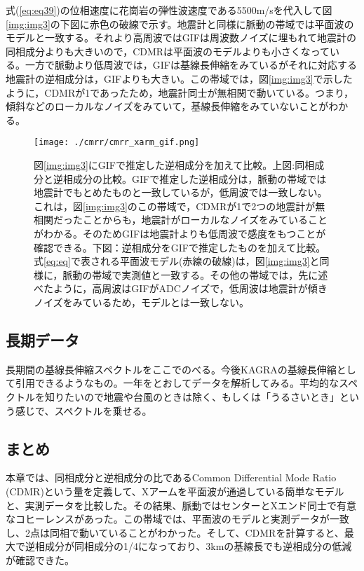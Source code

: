 式(\ref{eq:eq39})の位相速度に花崗岩の弾性波速度である5500m/sを代入して図\ref{img:img3}の下図に赤色の破線で示す。地震計と同様に脈動の帯域では平面波のモデルと一致する。それより高周波ではGIFは周波数ノイズに埋もれて地震計の同相成分よりも大きいので，CDMRは平面波のモデルよりも小さくなっている。一方で脈動より低周波では，GIFは基線長伸縮をみているがそれに対応する地震計の逆相成分は，GIFよりも大きい。この帯域では，図\ref{img:img3}で示したように，CDMRが1であったため，地震計同士が無相関で動いている。つまり，傾斜などのローカルなノイズをみていて，基線長伸縮をみていないことがわかる。

\begin{figure}[htbp]
  \begin{center}
    \texttt{[image: ./cmrr/cmrr\_xarm\_gif.png]}
  \end{center}
  \caption{図\ref{img:img3}にGIFで推定した逆相成分を加えて比較。上図:同相成分と逆相成分の比較。GIFで推定した逆相成分は，脈動の帯域では地震計でもとめたものと一致しているが，低周波では一致しない。これは，図\ref{img:img3}のこの帯域で，CDMRが1で2つの地震計が無相関だったことからも，地震計がローカルなノイズをみていることがわかる。そのためGIFは地震計よりも低周波で感度をもつことが確認できる。下図：逆相成分をGIFで推定したものを加えて比較。式\ref{eq:eq}で表される平面波モデル(赤線の破線)は，図\ref{img:img3}と同様に，脈動の帯域で実測値と一致する。その他の帯域では，先に述べたように，高周波はGIFがADCノイズで，低周波は地震計が傾きノイズをみているため，モデルとは一致しない。
  }\label{img:img4}
\end{figure}


\subsection{長期データ}
長期間の基線長伸縮スペクトルをここでのべる。今後KAGRAの基線長伸縮として引用できるようなもの。一年をとおしてデータを解析してみる。平均的なスペクトルを知りたいので地震や台風のときは除く、もしくは「うるさいとき」という感じで、スペクトルを乗せる。


\subsection{まとめ}
本章では、同相成分と逆相成分の比であるCommon Differential Mode Ratio (CDMR)という量を定義して、Xアームを平面波が通過している簡単なモデルと、実測データを比較した。その結果、脈動ではセンターとXエンド同士で有意なコヒーレンスがあった。この帯域では、平面波のモデルと実測データが一致し、2点は同相で動いていることがわかった。そして、CDMRを計算すると、最大で逆相成分が同相成分の1/4になっており、3kmの基線長でも逆相成分の低減が確認できた。


